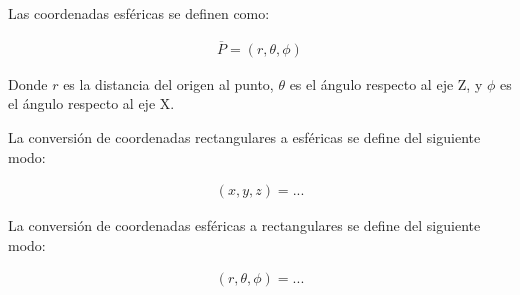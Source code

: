 Las coordenadas esféricas se definen como:

\begin{eqnarray*}
  \overline{P} = \left(r,\theta,\phi\right)
\end{eqnarray*}

Donde ${r}$ es la distancia del origen al punto, ${\theta}$ es el ángulo respecto al eje Z, y ${\phi}$ es el ángulo respecto al eje X.

La conversión de coordenadas rectangulares a esféricas se define del siguiente modo:

\begin{eqnarray*}
  \left(x,y,z\right) = ...
\end{eqnarray*}

La conversión de coordenadas esféricas a rectangulares se define del siguiente modo:

\begin{eqnarray*}
  \left(r,\theta,\phi\right) = ...
\end{eqnarray*}
